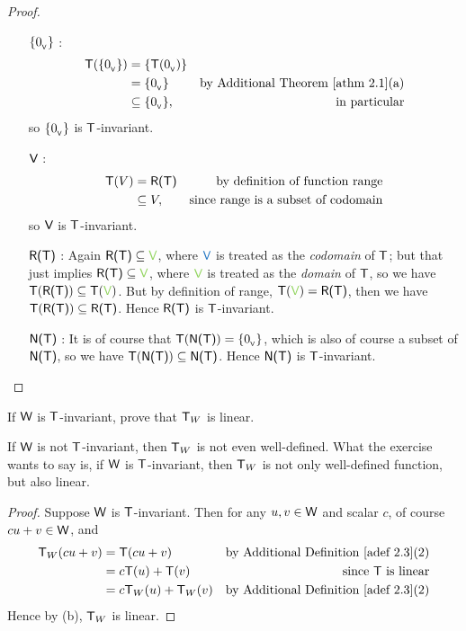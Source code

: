 \begin{proof} \ 

\begin{enumerate}
\item[\(\{ 0_{_{\textsf{V}}} \}\)]:
    \begin{align*}
        \T(\{ \OV \}) & = \{ \T(\OV) \} \\
                      & = \{ \OV \} & \text{by \ATHM{2.1}(a)} \\
                      & \subseteq \{ \OV \}, & \text{in particular}
    \end{align*}
    so \(\{ 0_{_{\textsf{V}}} \}\) is \(\textsf{T}\)-invariant.
\item[\(\textsf{V}\)]:
    \begin{align*}
        \textsf{T}(V) & = \textsf{R(T)} & \text{by definition of function range} \\
              & \subseteq V, & \text{since range is a subset of codomain}
    \end{align*}
    so \(\textsf{V}\) is \(\textsf{T}\)-invariant.
\item[\(\textsf{R(T)}\)]:
    Again \(\RANGET \subseteq \GREEN{\V}\), where \(\BLUE{\V}\) is treated as the \emph{codomain} of \(\textsf{T}\);
    but that just implies \(\RANGET \subseteq \GREEN{\V}\), where \(\GREEN{\V}\) is treated as the \emph{domain} of \(\textsf{T}\), so we have \(\T(\RANGET) \subseteq \T(\GREEN{\V})\).
    But by definition of range, \(\T(\GREEN{\V}) = \RANGET\), then we have \(\textsf{T}(\textsf{R(T)}) \subseteq \textsf{R(T)}\).
    Hence \(\textsf{R(T)}\) is \(\textsf{T}\)-invariant.
\item[\(\textsf{N(T)}\)]:
    It is of course that \(\textsf{T}(\textsf{N(T)}) = \{ 0_{_{\textsf{V}}} \}\), which is also of course a subset of \(\textsf{N(T)}\), so we have \(\textsf{T}(\textsf{N(T)}) \subseteq \textsf{N(T)}\).
    Hence \(\textsf{N(T)}\) is \(\textsf{T}\)-invariant.
\end{enumerate}
\end{proof}

\begin{exercise} \label{exercise 2.1.30}
If \(\textsf{W}\) is \(\textsf{T}\)-invariant, prove that \(\textsf{T}_W\) is linear.
\end{exercise}

\begin{note}
If \(\textsf{W}\) is not \(\textsf{T}\)-invariant, then \(\textsf{T}_W\) is not even well-defined.
What the exercise wants to say is, if \(\textsf{W}\) is \(\textsf{T}\)-invariant, then \(\textsf{T}_W\) is not only well-defined function, but also linear.
\end{note}

\begin{proof}
Suppose \(\textsf{W}\) is \(\textsf{T}\)-invariant.
Then for any \(u, v \in \textsf{W}\) and scalar \(c\), of course \(cu + v \in \textsf{W}\), and
\begin{align*}
    \T_W(cu + v) & = \T(cu + v) & \text{by \ADEF{2.3}(2)} \\
                 & = c\T(u) + \T(v) & \text{since \(\T\) is linear} \\
                 & = c\T_W(u) + \T_W(v) & \text{by \ADEF{2.3}(2)}
\end{align*}
Hence by (b), \(\textsf{T}_W\) is linear.
\end{proof}

